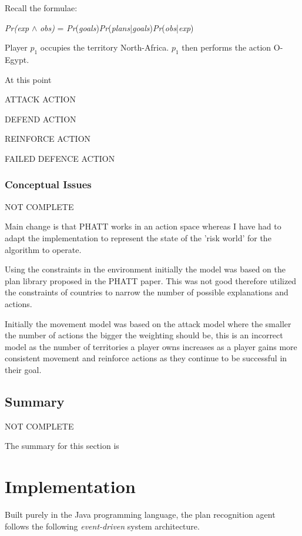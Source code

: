 \documentclass[parskip]{cs4rep}
\begin{document}
Recall the formulae:\newline

\centerline{
\textit{Pr(exp} $\wedge$ \textit{obs)} = \textit{Pr}(\textit{goals})\textit{Pr}(\textit{plans}|\textit{goals})\textit{Pr}(\textit{obs}|\textit{exp})
}

Player $p_1$ occupies the territory North-Africa. $p_1$ then performs the action O-Egypt.

At this point

ATTACK ACTION

DEFEND ACTION

REINFORCE ACTION

FAILED DEFENCE ACTION

\subsection{Conceptual Issues}

NOT COMPLETE

Main change is that PHATT works in an action space whereas I have had to adapt the implementation to represent the state of the 'risk world' for the algorithm to operate.

Using the constraints in the environment initially the model was based on the plan library proposed in the PHATT paper. This was not good therefore utilized the constraints of countries to narrow the number of possible explanations and actions.

Initially the movement model was based on the attack model where the smaller the number of actions the bigger the weighting should be, this is an incorrect model as the number of territories a player owns increases as a player gains more consistent movement and reinforce actions as they continue to be successful in their goal.

\section{Summary}

NOT COMPLETE

The summary for this section is

\chapter{Implementation}

Built purely in the Java programming language, the plan recognition agent follows the following \textit{event-driven} system architecture.
\end{document}
